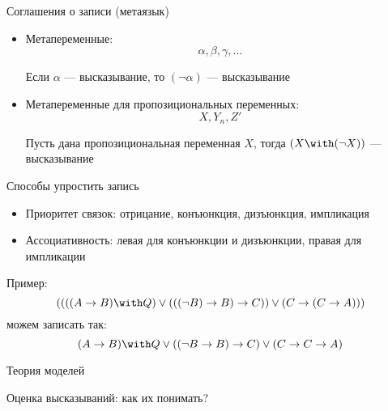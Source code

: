 \documentclass[handout]{beamer}
\begin{document}
\begin{frame}{Соглашения о записи (метаязык)}
\begin{itemize}
\item Метапеременные:
$$\alpha, \beta, \gamma, \dots$$\pause

Если $\alpha$ --- высказывание, то $(\neg\alpha)$ --- высказывание\pause\vspace{0.3cm}

\item Метапеременные для пропозициональных переменных:
$$X, Y_{n}, Z'$$\pause

Пусть дана пропозициональная переменная $X$, тогда $(X\with(\neg X))$ --- высказывание
\end{itemize}

\end{frame}

\begin{frame}{Способы упростить запись}
\begin{itemize}
\item Приоритет связок: отрицание, конъюнкция, дизъюнкция, импликация \pause
\item Ассоциативность: левая для конъюнкции и дизъюнкции, правая для импликации \pause
\end{itemize}
Пример:
$$((((A\rightarrow B)\with Q)\vee(((\neg B)\rightarrow B) \rightarrow C)) \vee (C \rightarrow (C\rightarrow A)))$$
можем записать так:
$$(A\rightarrow B)\with Q\vee((\neg B\rightarrow B) \rightarrow C) \vee (C \rightarrow C\rightarrow A)$$
\end{frame}

\begin{frame}{Теория моделей}

Оценка высказываний: как их понимать?


\end{frame}
\end{document}
